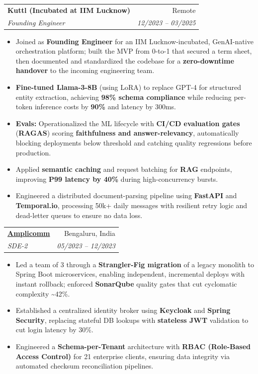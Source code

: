 \documentclass[11pt,a4paper]{article}
\makeatletter
\newcommand{\resumeItem}[1]{
  \item\small{
    {#1 \vspace{-2pt}}
  }
}
\newcommand{\resumeSubheading}[4]{
  \vspace{-1pt}\item
    \begin{tabular*}{0.97\textwidth}[t]{l@{\extracolsep{\fill}}r}
      \textbf{#1} & #2 \\
      \textit{\small#3} & \textit{\small #4} \\
    \end{tabular*}\vspace{-5pt}
}
\newcommand{\resumeItemListStart}{\begin{itemize}[itemsep=2pt, topsep=0pt, partopsep=0pt]}
\newcommand{\resumeItemListEnd}{\end{itemize}\vspace{-5pt}}
\makeatother
\begin{document}
    \resumeSubheading
      {Kuttl (Incubated at IIM Lucknow)}{Remote}
      {Founding Engineer}{12/2023 -- 03/2025}
      \resumeItemListStart
        \resumeItem{Joined as \textbf{Founding Engineer} for an IIM Lucknow-incubated, GenAI-native orchestration platform; built the MVP from 0-to-1 that secured a term sheet, then documented and standardized the codebase for a \textbf{zero-downtime handover} to the incoming engineering team.}
        \resumeItem{\textbf{Fine-tuned Llama-3-8B} (using LoRA) to replace GPT-4 for structured entity extraction, achieving \textbf{98\% schema compliance} while reducing per-token inference costs by \textbf{90\%} and latency by 300ms.}
        \resumeItem{\textbf{Evals:} Operationalized the ML lifecycle with \textbf{CI/CD evaluation gates} (\textbf{RAGAS}) scoring \textbf{faithfulness and answer-relevancy}, automatically blocking deployments below threshold and catching quality regressions before production.}
        \resumeItem{Applied \textbf{semantic caching} and request batching for \textbf{RAG} endpoints, improving \textbf{P99 latency by 40\%} during high-concurrency bursts.}
        \resumeItem{Engineered a distributed document-parsing pipeline using \textbf{FastAPI} and \textbf{Temporal.io}, processing 50k+ daily messages with resilient retry logic and dead-letter queues to ensure no data loss.}
      \resumeItemListEnd

    \resumeSubheading
      {\href{https://amplicomm.com/}{Amplicomm}}{Bengaluru, India}
      {SDE-2}{05/2023 -- 12/2023}
      \resumeItemListStart
        \resumeItem{Led a team of 3 through a \textbf{Strangler-Fig migration} of a legacy monolith to Spring Boot microservices, enabling independent, incremental deploys with instant rollback; enforced \textbf{SonarQube} quality gates that cut cyclomatic complexity \textasciitilde{}42\%.}
        \resumeItem{Established a centralized identity broker using \textbf{Keycloak} and \textbf{Spring Security}, replacing stateful DB lookups with \textbf{stateless JWT} validation to cut login latency by 30\%.}
        \resumeItem{Engineered a \textbf{Schema-per-Tenant} architecture with \textbf{RBAC (Role-Based Access Control)} for 21 enterprise clients, ensuring data integrity via automated checksum reconciliation pipelines.}
      \resumeItemListEnd
\end{document}
